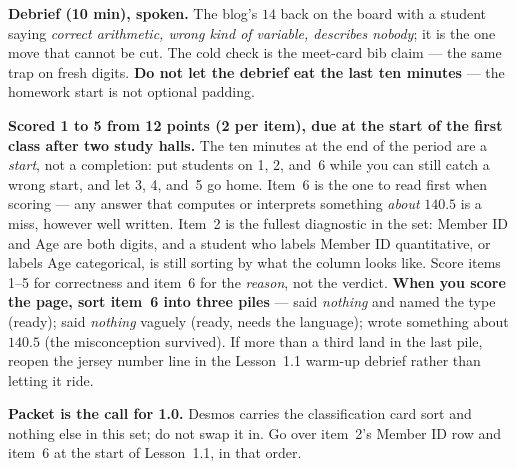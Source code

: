 \documentclass[10pt]{article}
\begin{document}
\begin{teachernote}
\textbf{Debrief (10 min), spoken.} The blog's $14$ back on the board with a student saying
\emph{correct arithmetic, wrong kind of variable, describes nobody}; it is the one move that
cannot be cut. The cold check is the meet-card bib claim --- the same trap on fresh digits.
\textbf{Do not let the debrief eat the last ten minutes} --- the homework start is not
optional padding.
\end{teachernote}

\begin{teachernote}[Homework]
\textbf{Scored 1 to 5 from 12 points (2 per item), due at the start of the first class after two study
halls.} The ten minutes at the end of the period are a \emph{start}, not a completion: put
students on 1, 2, and~6 while you can still catch a wrong start, and let 3, 4, and~5 go home.
Item~6 is the one to read first when scoring --- any answer that computes or interprets
something \emph{about} $140.5$ is a miss, however well written. Item~2 is the fullest
diagnostic in the set: Member ID and Age are both digits, and a student who labels Member ID
quantitative, or labels Age categorical, is still sorting by what the column looks like. Score
items 1--5 for correctness and item~6 for the \emph{reason}, not the verdict. \textbf{When
you score the page, sort item~6 into three piles} --- said \emph{nothing} and named the type
(ready); said \emph{nothing} vaguely (ready, needs the language); wrote something about
$140.5$ (the misconception survived). If more than a third land in the last pile, reopen the
jersey number line in the Lesson~1.1 warm-up debrief rather than letting it ride.

\textbf{Packet is the call for 1.0.} Desmos carries the classification card sort and nothing
else in this set; do not swap it in. Go over item~2's Member ID row and item~6 at the start
of Lesson~1.1, in that order.
\end{teachernote}
\end{document}
